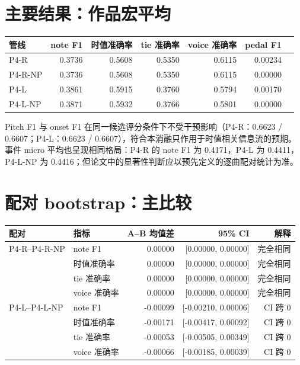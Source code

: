 \documentclass[11pt,a4paper]{ctexart}
\begin{document}
\section{主要结果：作品宏平均}
\begin{center}
\small
\begin{tabular}{lrrrrrr}
\toprule
管线 & note F1 & 时值准确率 & tie 准确率 & voice 准确率 & pedal F1 \\
\midrule
P4-R & 0.3736 & 0.5608 & 0.5350 & 0.6115 & 0.00234 \\
P4-R-NP & 0.3736 & 0.5608 & 0.5350 & 0.6115 & 0.00000 \\
P4-L & 0.3861 & 0.5915 & 0.3760 & 0.5794 & 0.00170 \\
P4-L-NP & 0.3871 & 0.5932 & 0.3766 & 0.5801 & 0.00000 \\
\bottomrule
\end{tabular}
\end{center}

Pitch F1 与 onset F1 在同一候选评分条件下不受干预影响（P4-R：0.6623 / 0.6607；P4-L：0.6623 / 0.6607），符合本消融只作用于时值相关信息流的预期。事件 micro 平均也呈现相同格局：P4-R 的 note F1 为 0.4171，P4-L 为 0.4411，P4-L-NP 为 0.4416；但论文中的显著性判断应以预先定义的逐曲配对统计为准。

\section{配对 bootstrap：主比较}
\begin{center}
\small
\begin{tabular}{llrrr}
\toprule
配对 & 指标 & A--B 均值差 & 95\% CI & 解释 \\
\midrule
P4-R--P4-R-NP & note F1 & 0.00000 & [0.00000, 0.00000] & 完全相同 \\
 & 时值准确率 & 0.00000 & [0.00000, 0.00000] & 完全相同 \\
 & tie 准确率 & 0.00000 & [0.00000, 0.00000] & 完全相同 \\
 & voice 准确率 & 0.00000 & [0.00000, 0.00000] & 完全相同 \\
\midrule
P4-L--P4-L-NP & note F1 & -0.00099 & [-0.00210, 0.00006] & CI 跨 0 \\
 & 时值准确率 & -0.00171 & [-0.00417, 0.00092] & CI 跨 0 \\
 & tie 准确率 & -0.00053 & [-0.00505, 0.00349] & CI 跨 0 \\
 & voice 准确率 & -0.00066 & [-0.00185, 0.00039] & CI 跨 0 \\
\bottomrule
\end{tabular}
\end{center}
\end{document}
